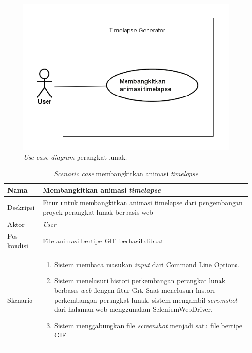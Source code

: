 \begin{figure}[H]
	\centering
		\includegraphics[scale=0.8]{Gambar/UseCaseDiagram1.png}
	\caption{\textit{Use case diagram} perangkat lunak.}
	\label{fig:uc}
\end{figure}
\begin{table}[]
    \centering
    \begin{tabular}{|p{3cm}|p{10cm}|}
    \hline
        Nama & Membangkitkan animasi \textit{timelapse}\\
    \hline
    \hline
        Deskripsi & Fitur untuk membangkitkan animasi timelapse dari pengembangan proyek perangkat lunak berbasis web\\
    \hline
        Aktor & \textit{User} \\
    \hline
        Pos-kondisi &  File animasi bertipe GIF berhasil dibuat\\
    \hline
        Skenario & 
        \begin{enumerate}
        \item Sistem membaca masukan \textit{input} dari Command Line Options.
            \item Sistem menelusuri histori perkembangan perangkat lunak berbasis \textit{web} dengan fitur
Git. Saat menelusuri histori perkembangan perangkat lunak, sistem mengambil \textit{screenshot} dari halaman web menggunakan SeleniumWebDriver.
            \item Sistem menggabungkan file \textit{screenshot} menjadi satu file bertipe GIF.
        \end{enumerate}\\
    \hline
    \end{tabular}
    \caption{\textit{Scenario case} membangkitkan animasi \textit{timelapse}}
    \label{tab:tabel_sc_animasi}
\end{table}

